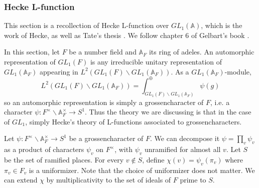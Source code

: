 \documentclass[12pt,a4paper,english]{article}
\theoremstyle{plain}
\theoremstyle{definition}
\begin{document}
\subsubsection{Hecke L-function}
This section is a recollection of Hecke L-function over $GL_{1}(\mathbb{A})$, which is the work of Hecke, as well as Tate's thesis \cite{tate1997fourier}. We follow chapter 6 of Gelbart's book \cite{gelbart2016automorphic}.

In this section, let $F$ be a number field and $\mathbb{A}_{F}$ its ring of adeles. An automorphic representation of $GL_{1}(F)$ is any irreducible unitary representation of $GL_{1}(\mathbb{A}_{F})$ appearing in $L^{2}(GL_{1}(F)\backslash GL_{1}(\mathbb{A}_{F}))$. As a $GL_{1}(\mathbb{A}_{F})$-module,
\begin{equation*}
    L^{2}(GL_{1}(F)\backslash GL_{1}(\mathbb{A}_{F}))=\int^{\oplus}_{GL_{1}(F)\backslash GL_{1}(\mathbb{A}_{F})}\psi(g)
\end{equation*}
so an automorphic representation is simply a grossencharacter of $F$, i.e.  a character $\psi:F^{\times}\backslash \mathbb{A}_{F}^{\times}\rightarrow S^{1}$. Thus the theory we are discussing is that in the case of $GL_{1}$, simply Hecke's theory of L-functions associated to grossencharacters. 

Let $\psi: F^{\times}\backslash \mathbb{A}_{F}^{\times}\rightarrow S^{1}$ be a grossencharacter of $F$. We can decompose it $\psi=\prod_{v}\psi_{v}$ as a product of characters $\psi_{v}$ on $F^{\times}$, with $\psi_{v}$ unramified for almost all $v$. Let $S$ be the set of ramified places. For every $v\not\in S$, define $\chi(v)=\psi_{v}(\pi_{v})$ where $\pi_{v}\in F_{v}$ is a uniformizer. Note that the choice of uniformizer does not matter. We can extend $\chi$ by multiplicativity to the set of ideals of $F$ prime to $S$. 
\end{document}

